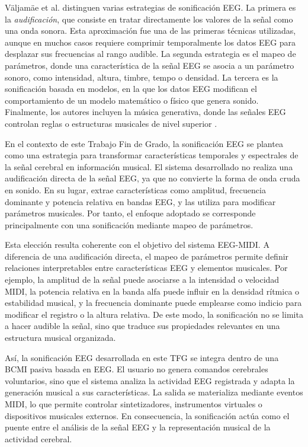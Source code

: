 \documentclass[../main.tex]{subfiles}
\begin{document}
Väljamäe et al. distinguen varias estrategias de sonificación EEG. La primera es la \textit{audificación}, que consiste en tratar directamente los valores de la señal como una onda sonora. Esta aproximación fue una de las primeras técnicas utilizadas, aunque en muchos casos requiere comprimir temporalmente los datos EEG para desplazar sus frecuencias al rango audible. La segunda estrategia es el mapeo de parámetros, donde una característica de la señal EEG se asocia a un parámetro sonoro, como intensidad, altura, timbre, tempo o densidad. La tercera es la sonificación basada en modelos, en la que los datos EEG modifican el comportamiento de un modelo matemático o físico que genera sonido. Finalmente, los autores incluyen la música generativa, donde las señales EEG controlan reglas o estructuras musicales de nivel superior \cite{Valjamae2013EEGSonification}.

En el contexto de este Trabajo Fin de Grado, la sonificación EEG se plantea como una estrategia para transformar características temporales y espectrales de la señal cerebral en información musical. El sistema desarrollado no realiza una audificación directa de la señal EEG, ya que no convierte la forma de onda cruda en sonido. En su lugar, extrae características como amplitud, frecuencia dominante y potencia relativa en bandas EEG, y las utiliza para modificar parámetros musicales. Por tanto, el enfoque adoptado se corresponde principalmente con una sonificación mediante mapeo de parámetros.

Esta elección resulta coherente con el objetivo del sistema EEG-MIDI. A diferencia de una audificación directa, el mapeo de parámetros permite definir relaciones interpretables entre características EEG y elementos musicales. Por ejemplo, la amplitud de la señal puede asociarse a la intensidad o velocidad MIDI, la potencia relativa en la banda alfa puede influir en la densidad rítmica o estabilidad musical, y la frecuencia dominante puede emplearse como indicio para modificar el registro o la altura relativa. De este modo, la sonificación no se limita a hacer audible la señal, sino que traduce sus propiedades relevantes en una estructura musical organizada.

Así, la sonificación EEG desarrollada en este TFG se integra dentro de una BCMI pasiva basada en EEG. El usuario no genera comandos cerebrales voluntarios, sino que el sistema analiza la actividad EEG registrada y adapta la generación musical a sus características. La salida se materializa mediante eventos MIDI, lo que permite controlar sintetizadores, instrumentos virtuales o dispositivos musicales externos. En consecuencia, la sonificación actúa como el puente entre el análisis de la señal EEG y la representación musical de la actividad cerebral.
\end{document}

